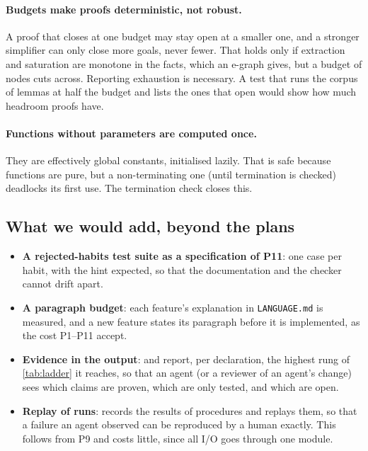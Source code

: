 \documentclass[11pt,a4paper]{article}
\newcommand{\code}[1]{\texttt{\detokenize{#1}}}
\newcommand{\file}[1]{\texttt{#1}}
\begin{document}
\paragraph{Budgets make proofs deterministic, not robust.}
A proof that closes at one budget may stay open at a smaller one, and a stronger simplifier
can only close more goals, never fewer. That holds only if extraction and saturation are
monotone in the facts, which an e-graph gives, but a budget of nodes cuts across. Reporting
exhaustion is necessary. A test that runs the corpus of lemmas at half the budget and lists
the ones that open would show how much headroom proofs have.

\paragraph{Functions without parameters are computed once.}
They are effectively global constants, initialised lazily. That is safe because functions are
pure, but a non-terminating one (until termination is checked) deadlocks its first use.
The termination check closes this.

\subsection{What we would add, beyond the plans}

\begin{itemize}
\item \textbf{A rejected-habits test suite as a specification of P11}: one case per habit,
  with the hint expected, so that the documentation and the checker cannot drift apart.
\item \textbf{A paragraph budget}: each feature's explanation in \file{LANGUAGE.md} is
  measured, and a new feature states its paragraph before it is implemented, as the cost
  P1--P11 accept.
\item \textbf{Evidence in the output}: \code{test} and \code{prove} report, per declaration,
  the highest rung of \cref{tab:ladder} it reaches, so that an agent (or a reviewer of an
  agent's change) sees which claims are proven, which are only tested, and which are open.
\item \textbf{Replay of runs}: \code{run} records the results of \code{os} procedures and
  replays them, so that a failure an agent observed can be reproduced by a human exactly.
  This follows from P9 and costs little, since all I/O goes through one module.
\end{itemize}
\end{document}
